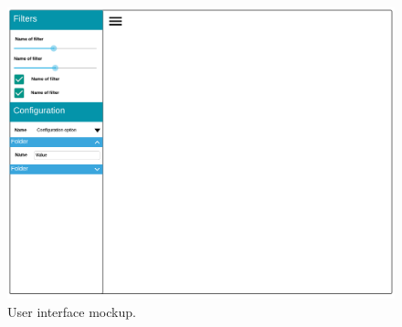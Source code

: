 \begin{figure}[H]
	\centering
    \includegraphics[width=\textwidth]{images/design/interface}
    \caption[User interface mockup]{User interface mockup.}
    \label{fig:user_interface_mockup}
\end{figure}
